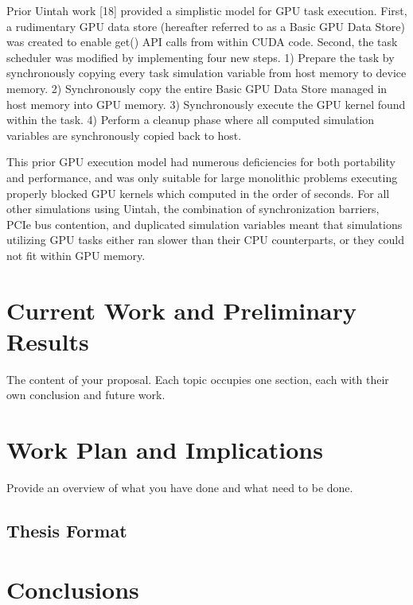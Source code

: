\documentclass[12pt]{article}
\begin{document}
Prior Uintah work [18] provided a simplistic model for GPU task execution.  First, a rudimentary GPU data store (hereafter referred to as a Basic GPU Data Store) was created to enable get() API calls from within CUDA code.  Second, the task scheduler was modified by implementing four new steps.  1) Prepare the task by synchronously copying every task simulation variable from host memory to device memory. 2) Synchronously copy the entire Basic GPU Data Store managed in host memory into GPU memory.  3) Synchronously execute the GPU kernel found within the task.  4) Perform a cleanup phase where all computed simulation variables are synchronously copied back to host.  
	
This prior GPU execution model had numerous deficiencies for both portability and performance, and was only suitable for large monolithic problems executing properly blocked GPU kernels which computed in the order of seconds.  For all other simulations using Uintah, the combination of synchronization barriers, PCIe bus contention, and duplicated simulation variables meant that simulations utilizing GPU tasks either ran slower than their CPU counterparts, or they could not fit within GPU memory.  

\section{Current Work and Preliminary Results}
\label{ch:proposal}

The content of your proposal. Each topic occupies one section, each
with their own conclusion and future work.

\section{Work Plan and Implications}
\label{ch:plan}

Provide an overview of what you have done and what need to be done.

\subsection{Thesis Format}
\label{ch:format}

\section{Conclusions}
\label{ch:plan}


\end{document}
